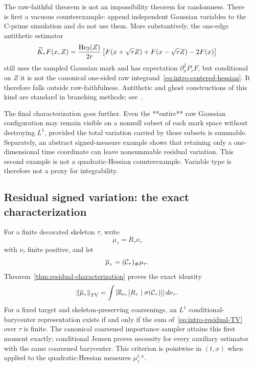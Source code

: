 The raw-faithful theorem is not an impossibility theorem for randomness. There is first a vacuous counterexample: append independent Gaussian variables to the C-prime simulation and do not use them. More substantively, the one-edge antithetic estimator
\begin{equation}
  \widetilde K_rF(x,Z)
  =
  \frac{\operatorname{He}_2(Z)}{2r}
  \left[F(x+\sqrt rZ)+F(x-\sqrt rZ)-2F(x)\right]
  \label{eq:intro-antithetic}
\end{equation}
still uses the sampled Gaussian mark and has expectation $\partial_x^2P_rF$, but conditional on $Z$ it is not the canonical one-sided raw integrand~\eqref{eq:intro-centered-hessian}. It therefore falls outside raw-faithfulness. Antithetic and ghost constructions of this kind are standard in branching methods; see~\cite{Warin2017}.

The final characterization goes further. Even the **entire** raw Gaussian configuration may remain visible on a nonnull subset of each mark space without destroying $L^1$, provided the total variation carried by those subsets is summable. Separately, an abstract signed-measure example shows that retaining only a one-dimensional time coordinate can leave nonsummable residual variation. This second example is not a quadratic-Hessian counterexample. Variable type is therefore not a proxy for integrability.

\subsection{Residual signed variation: the exact characterization}

For a finite decorated skeleton $\tau$, write
\begin{equation*}
  \mu_\tau=R_\tau\nu_\tau
\end{equation*}
with $\nu_\tau$ finite positive, and let
\begin{equation}
  \overline\mu_\tau
  =
  (\mathcal C_\tau)_\#\mu_\tau.
  \label{eq:intro-coarsening}
\end{equation}
Theorem~\ref{thm:residual-characterization} proves the exact identity
\begin{equation}
  \left\lVert\overline\mu_\tau\right\rVert_{\mathrm{TV}}
  =
  \int
  \left|
    \mathbb E_{\nu_\tau}
    [R_\tau\mid\sigma(\mathcal C_\tau)]
  \right|
  d\nu_\tau.
  \label{eq:intro-residual-TV}
\end{equation}
For a fixed target and skeleton-preserving coarsenings, an $L^1$ conditional-barycenter representation exists if and only if the sum of~\eqref{eq:intro-residual-TV} over $\tau$ is finite. The canonical coarsened importance sampler attains this first moment exactly; conditional Jensen proves necessity for every auxiliary estimator with the same coarsened barycenter. This criterion is pointwise in $(t,x)$ when applied to the quadratic-Hessian measures $\mu_\tau^{t,x}$.

